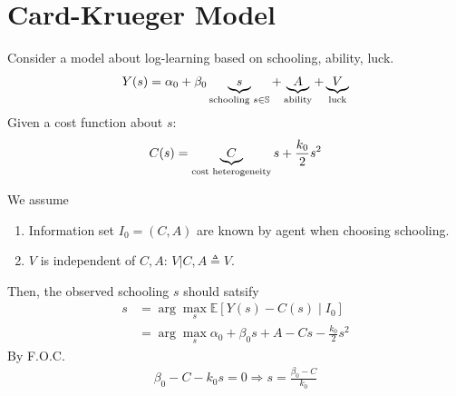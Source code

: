 \documentclass[11pt]{elegantbook}
\begin{document}
\section{Card-Krueger Model}
Consider a model about log-learning based on schooling, ability, luck.
\begin{equation}
    \begin{aligned}
        Y(s)=\alpha_0+\beta_0 \underbrace{s}_{\textnormal{schooling }s\in \mathbb{S}} +\underbrace{A}_\textnormal{ability} + \underbrace{V}_\textnormal{luck}
    \end{aligned}
    \nonumber
\end{equation}
Given a cost function about $s$:
\begin{equation}
    \begin{aligned}
        C(s)=\underbrace{C}_\textnormal{cost heterogeneity}s+\frac{k_0}{2}s^2
    \end{aligned}
    \nonumber
\end{equation}
\begin{assumption}
    We assume
    \begin{enumerate}
        \item Information set $I_0=(C,A)$ are known by agent when choosing schooling.
        \item $V$ is independent of $C,A$: $V|C,A\triangleq V$.
    \end{enumerate}
\end{assumption}
Then, the observed schooling $s$ should satsify
\begin{equation}
    \begin{aligned}
        s&=\arg\max_s \mathbb{E}[Y(s)-C(s)\mid I_0]\\
        &=\arg\max_s \alpha_0+\beta_0 s+A-Cs-\frac{k_0}{2}s^2
    \end{aligned}
    \nonumber
\end{equation}
By F.O.C.
\begin{equation}
    \begin{aligned}
        \beta_0-C-k_0 s=0 \Rightarrow s=\frac{\beta_0-C}{k_0}
    \end{aligned}
    \nonumber
\end{equation}
\end{document}
